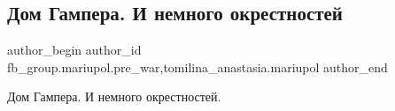  
 
 
 
 

\subsection{Дом Гампера. И немного окрестностей}
\label{sec:12_02_2023.fb.fb_group.mariupol.pre_war.5.dom_gampera__i_nemno}
 
\ifcmt
 author_begin
   author_id fb_group.mariupol.pre_war,tomilina_anastasia.mariupol
 author_end
\fi

Дом Гампера. И немного окрестностей.


